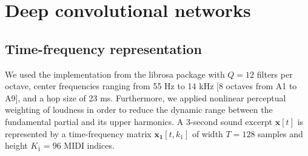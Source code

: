 \documentclass{article}
\begin{document}






\section{Deep convolutional networks}
\subsection{Time-frequency representation}
We used the implementation from the librosa package \cite{McFee2015} with $Q=12$ filters per octave, center frequencies ranging from 55 Hz to 14 kHz [8 octaves from A1 to A9], and a hop size of 23 ms. Furthermore, we applied nonlinear perceptual weighting of loudness in order to reduce the dynamic range between the fundamental partial and its upper harmonics. A 3-second sound excerpt $\boldsymbol{x}[t]$ is represented by a time-frequency matrix $\boldsymbol{x_1}[t,k_1]$ of width $T=128$ samples and height $K_1=96$ MIDI indices.
\end{document}
